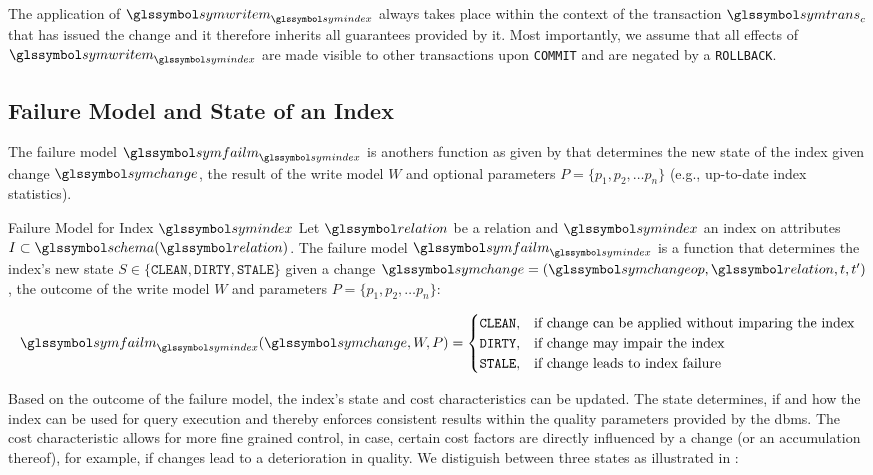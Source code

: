 The application of $\symwritem_{\symindex}$ always takes place within the context of the transaction $\symtrans_c$ that has issued the change and it therefore inherits all guarantees provided by it. Most importantly, we assume that all effects of $\symwritem_{\symindex}$ are made visible to other transactions upon \texttt{COMMIT} and are negated by a \texttt{ROLLBACK}.

\subsection{Failure Model and State of an Index}

The failure model $\symfailm_{\symindex}$ is anothers function as given by  that determines the new state of the index given change $\symchange$, the result of the write model $W$ and optional parameters $P = \{p_1, p_2, \ldots p_n\}$ (e.g., up-to-date index statistics).

\begin{definition}[label=definition:failure_model]{Failure Model for Index $\symindex$}{}
    Let $\relation$ be a relation and $\symindex$ an index on attributes $I \subset \schema(\relation)$. The failure model $\symfailm_{\symindex}$ is a function that determines the index's new state $S \in \lbrace \mathtt{CLEAN}, \mathtt{DIRTY}, \mathtt{STALE} \rbrace$ given a change $\symchange = (\symchangeop, \relation, t, t^{\prime})$, the outcome of the write model $W$ and parameters $P = \{p_1, p_2, \ldots p_n\}$:

    \begin{equation*}
        \symfailm_{\symindex}(\symchange,W,P) = 
        \begin{cases}
           \mathtt{CLEAN}, & \text{if change can be applied without imparing the index}\\
           \mathtt{DIRTY}, & \text{if change may impair the index}\\
           \mathtt{STALE}, & \text{if change leads to index failure} \\
        \end{cases}
    \end{equation*}
\end{definition}

Based on the outcome of the failure model, the index's state and cost characteristics can be updated. The state determines, if and how the index can be used for query execution and thereby enforces consistent results within the quality parameters provided by the \acrshort{dbms}. The cost characteristic allows for more fine grained control, in case, certain cost factors are directly influenced by a change (or an accumulation thereof), for example, if changes lead to a deterioration in quality. We distiguish between three states as illustrated in :

